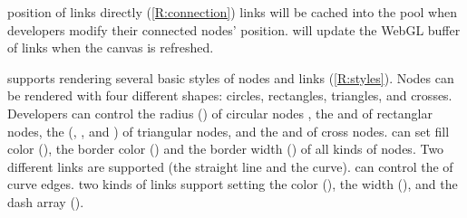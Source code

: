 
      position of links  directly (\ref{R:connection})  links will be cached into the pool when developers modify their connected nodes' position.  \RenEng will update the WebGL buffer of links when the canvas is refreshed.


 \RenEng supports  rendering  several basic styles of nodes and links (\ref{R:styles}).
Nodes can be rendered with four different shapes: circles, rectangles, triangles, and crosses.
Developers can control the radius () of circular nodes , the  and   of rectanglar nodes, the  (, , and ) of triangular nodes, and the  and   of cross nodes.
 can set  fill color (), the border color () and the border width () of all kinds of nodes.
Two different links are supported (the straight line and the curve). 
 can control the  of curve edges.
 two kinds of links support  setting  the color (), the width (), and the dash array ().

\subsubsection{\IntMan} \label{sec:interaction manager}

